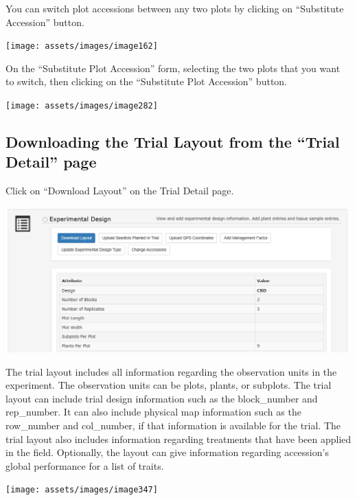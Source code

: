 \documentclass[
  12pt,
]{book}
\begin{document}
You can switch plot accessions between any two plots by clicking on ``Substitute Accession'' button.

\begin{center}\texttt{[image: assets/images/image162]} \end{center}

On the ``Substitute Plot Accession'' form, selecting the two plots that you want to switch, then clicking on the ``Substitute Plot Accession'' button.

\begin{center}\texttt{[image: assets/images/image282]} \end{center}

\hypertarget{downloading-the-trial-layout-from-the-trial-detail-page}{%
\subsection{Downloading the Trial Layout from the ``Trial Detail'' page}\label{downloading-the-trial-layout-from-the-trial-detail-page}}

Click on ``Download Layout'' on the Trial Detail page.

\begin{center}\includegraphics[width=0.95\linewidth]{assets/images/image348} \end{center}

The trial layout includes all information regarding the observation units in the experiment. The observation units can be plots, plants, or subplots. The trial layout can include trial design information such as the block\_number and rep\_number. It can also include physical map information such as the row\_number and col\_number, if that information is available for the trial. The trial layout also includes information regarding treatments that have been applied in the field. Optionally, the layout can give information regarding accession's global performance for a list of traits.

\begin{center}\texttt{[image: assets/images/image347]} \end{center}
\end{document}
